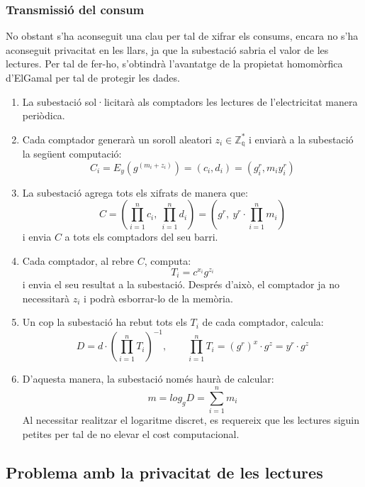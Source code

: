 \documentclass{article}
\begin{document}
\subsubsection{Transmissió del consum}
No obstant s'ha aconseguit una clau per tal de xifrar els consums, encara no s'ha aconseguit privacitat en les llars, ja que la subestació sabria el valor de les lectures. Per tal de fer-ho, s'obtindrà l'avantatge de la propietat homomòrfica d'ElGamal per tal de protegir les dades.
\begin{enumerate}
	\item La subestació sol·licitarà als comptadors les lectures de l'electricitat manera periòdica.
	\item Cada comptador generarà un soroll aleatori $z_i \in \mathbb{Z_q^*}$ i enviarà a la subestació la següent computació:
	\[C_i = E_y(g^{(m_i + z_i)}) = (c_i, d_i) = (g^r_i, m_i y^r_i)\]
	\item La subestació agrega tots els xifrats de manera que:
	\[C = (\prod_{i=1}^{n} c_i, \ \prod_{i=1}^{n} d_i) = (g^r, \ y^r \cdot \prod_{i=1}^{n} m_i)\]
	i envia $C$ a tots els comptadors del seu barri.
	\item Cada comptador, al rebre $C$, computa:
	\[T_i = c^{x_i} g^{z_i}\]
	i envia el seu resultat a la subestació. Després d'això, el comptador ja no necessitarà $z_i$ i podrà esborrar-lo de la memòria.
	\item Un cop la subestació ha rebut tots els $T_i$ de cada comptador, calcula:
	\[D = d \cdot (\prod_{i=1}^{n} T_i)^{-1}, \qquad \prod_{i=1}^{n} T_i = (g^{r})^x \cdot g^z = y^r \cdot g^z\]
	\item D'aquesta manera, la subestació només haurà de calcular:
	\[m = log_g D = \sum_{i=1}^{n} m_i\]
	Al necessitar realitzar el logaritme discret, es requereix que les lectures siguin petites per tal de no elevar el cost computacional.
\end{enumerate}
\subsection{Problema amb la privacitat de les lectures}
\end{document}

